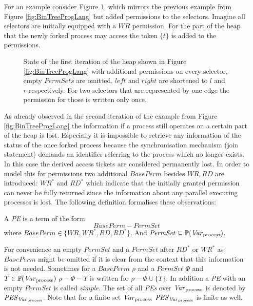 	For an example consider Figure \ref{fig:BinTreeProgLangPerm}, which mirrors
	the previous example from Figure \ref{fig:BinTreeProgLang} but added
	permissions to the selectors. Imagine all selectors are initially equipped
	with a $\mathit{WR}$ permission. For the part of the heap that the newly
	forked process may access the token $\{t\}$ is added to the permissions.
	\begin{figure}
	\begin{center}\end{center}
		\caption{State of the first iteration of the heap shown in Figure
			\ref{fig:BinTreeProgLang} with additional permissions on every
		selector, empty $\mathit{PermSets}$ are omitted, $\mathit{left}$ and
		$\mathit{right}$ are shortened to $l$ and $r$ respectively. For two
		selectors that are represented by one edge the permission for those is
		written only once.}
		\label{fig:BinTreeProgLangPerm}
	\end{figure}
	As already observed in the second iteration of the example from Figure
	\ref{fig:BinTreeProgLang} the information if a process still operates on a
	certain part of the heap is lost. Especially it is impossible to retrieve
	any information of the status of the once forked process because the
	synchronisation mechanism (join statement) demands an identifier referring
	to the process which no longer exists. In this case the derived access
	tickets are considered permanently lost. In order to model this for
	permissions two additional $\mathit{BasePerm}$ besides
	$\mathit{WR},\mathit{RD}$ are introduced: $\mathit{WR^{\ast}}$ and
	$\mathit{RD^{\ast}}$ which indicate that the initially granted permission
	can never be fully returned since the information about any parallel
	executing processes is lost. The following definition formalises these
	observations:
	\begin{definition}
		A \emph{\acl{PE}} is a term of the form
		$$\mathit{BasePerm} - \mathit{PermSet}$$
		where $\mathit{BasePerm}\in
		\{\mathit{WR},\mathit{WR^\ast},\mathit{RD},\mathit{RD^\ast}\}$.
		And $\mathit{PermSet}\subseteq\mathbb{P}(\mathit{Var}_{\text{process}})$.
	\end{definition}
	For convenience an empty $\mathit{PermSet}$ and a $\mathit{PermSet}$
	after $\mathit{RD^\ast}$ or $\mathit{WR^\ast}$ as $\mathit{BasePerm}$ might
	be omitted if it is clear from the context that this information is not
	needed.  Sometimes for a $\mathit{BasePerm}$ $\rho$ and a $\mathit{PermSet}$
	$\Phi$ and $T\in\mathbb{P}(\mathit{Var}_{\text{process}})$
	$\rho - \Phi - T$ is written for $\rho - \Phi\cup\{T\}$.
	In addition a \emph{\ac{PE}} with an empty $\mathit{PermSet}$ is called
	\emph{simple}. The set of all \emph{\acp{PE}} over $\mathit{Var}_{\text{process}}$ is denoted by
	$\mathit{PES}_{\mathit{Var}_{\text{process}}}$. Note that for a finite set $\mathit{Var}_{\text{process}}$ $\mathit{PES}_{\mathit{Var}_{\text{process}}}$
	is finite as well.

